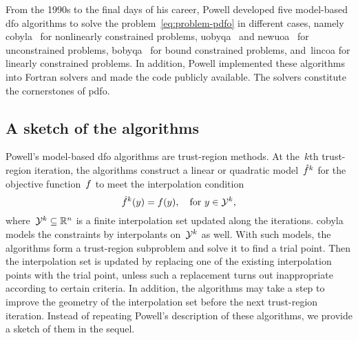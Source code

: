 From the 1990s to the final days of his career, Powell developed five model-based \gls{dfo} algorithms to solve the problem~\cref{eq:problem-pdfo} in different cases, namely \gls{cobyla}~\cite{Powell_1994} for nonlinearly constrained problems, \gls{uobyqa}~\cite{Powell_2002} and \gls{newuoa}~\cite{Powell_2006} for unconstrained problems, \gls{bobyqa}~\cite{Powell_2009} for bound constrained problems, and~\gls{lincoa} for linearly constrained problems.
In addition, Powell implemented these algorithms into Fortran solvers and made the code publicly available.
The solvers constitute the cornerstones of \gls{pdfo}.

\subsection{A sketch of the algorithms}

Powell's model-based \gls{dfo} algorithms are trust-region methods.
At the~$k$th trust-region iteration, the algorithms construct a linear or quadratic model~$\objm[k]$ for the objective function~$f$ to meet the interpolation condition
\begin{equation}
    \label{eq:itpls}
    \objm[k](y) = \obj(y), \quad \text{for~$y \in \xpt[k]$,}
\end{equation}
where~$\xpt[k] \subseteq \R^n$ is a finite interpolation set updated along the iterations.
\Gls{cobyla} models the constraints by interpolants on~$\xpt[k]$ as well.
With such models, the algorithms form a trust-region subproblem and solve it to find a trial point.
Then the interpolation set is updated by replacing one of the existing interpolation points with the trial point, unless such a replacement turns out inappropriate according to certain criteria.
In addition, the algorithms may take a step to improve the geometry of the interpolation set before the next trust-region iteration.
Instead of repeating Powell's description of these algorithms, we provide a sketch of them in the sequel.

